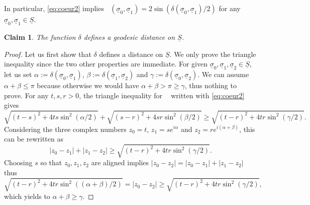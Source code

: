 \documentclass[JEP,XML,SOM,Unicode,published]{cedram}
\theoremstyle{plain}
\newtheorem{claim}[theorem]{Claim}
\theoremstyle{definition}
\newcommand{\dist}{\mathsf{d}}
\newcommand{\usigma}{\underline{\sigma}}
\DeclareMathOperator{\udist}{\underline{\dist}}
\newcommand{\uS}{\underline{S}}
\begin{document}
In particular, \eqref{eq:coeur2} implies
$\udist(\usigma_0,\usigma_1)=2\sin(\delta(\usigma_0,\usigma_1)/2)$
for any $\usigma_0,\usigma_1 \in \uS$.

\begin{claim}\label{claim:geodesicdelta}
The function $\delta$ defines a geodesic distance on $\uS$.
\end{claim}

\begin{proof}
Let us first show that $\delta$ defines a distance on $\uS$. We only prove the triangle inequality since the two other properties are immediate. For given $\usigma_0, \usigma_1,\usigma_2 \in \uS$, let us set $\alpha:= \delta(\usigma_0,\usigma_1)$, $\beta:=\delta(\usigma_1,\usigma_2)$ and $\gamma:=\delta(\usigma_0,\usigma_2)$. We can assume $\alpha + \beta \le \pi$ because otherwise we would have $\alpha + \beta > \pi \ge \gamma$, thus nothing to prove. For any $t,s,r>0$, the triangle inequality for $\udist$ written with \eqref{eq:coeur2} gives
\[
\sqrt{(t-s)^2 + 4 ts\sin^2(\alpha/2)} + \sqrt{(s-r)^2 + 4 sr\sin^2(\beta/2)} \ge \sqrt{(t-r)^2 + 4tr\sin^2(\gamma/2)}.
\]
Considering the three complex numbers $z_0=t$, $z_1 = se^{i\alpha}$ and $z_2 = re^{i(\alpha + \beta)}$, this can be rewritten as
\[
|z_0-z_1| + |z_1-z_2| \ge \sqrt{(t-r)^2 + 4tr\sin^2(\gamma/2)}.
\]
Choosing $s$ so that $z_0, z_1, z_2$ are aligned implies $|z_0-z_2| = |z_0-z_1| + |z_1 - z_2|$ thus
\[
\sqrt{(t-r)^2 + 4tr\sin^2((\alpha+\beta)/2)} = |z_0-z_2| \ge \sqrt{(t-r)^2+ 4tr\sin^2(\gamma/2)},
\]
which yields to $\alpha + \beta \ge \gamma$.


\end{proof}
\end{document}
